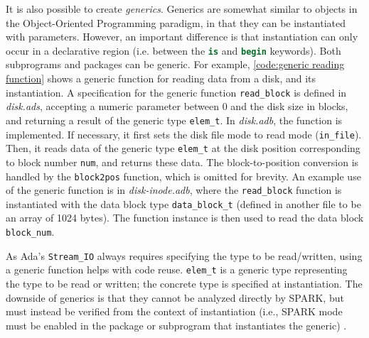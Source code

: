 It is also possible to create \textit{generics}.
Generics are somewhat similar to objects in the Object-Oriented Programming paradigm, in that they can be instantiated with parameters.
However, an important difference is that instantiation can only occur in a declarative region (i.e. between the \lstinline[language=Ada]{is} and \lstinline[language=Ada]{begin} keywords).
Both subprograms and packages can be generic.
For example, \autoref{code:generic reading function} shows a generic function for reading data from a disk, and its instantiation.
A specification for the generic function \lstinline[language=Ada]{read_block} is defined in \textit{disk.ads}, accepting a numeric parameter between 0 and the disk size in blocks, and returning a result of the generic type \lstinline[language=Ada]{elem_t}.
In \textit{disk.adb}, the function is implemented.
If necessary, it first sets the disk file mode to read mode (\lstinline[language=Ada]{in_file}).
Then, it reads data of the generic type \lstinline[language=Ada]{elem_t} at the disk position corresponding to block number \lstinline[language=Ada]{num}, and returns these data.
The block-to-position conversion is handled by the \lstinline[language=Ada]{block2pos} function, which is omitted for brevity.
An example use of the generic function is in \textit{disk-inode.adb}, where the \lstinline[language=Ada]{read_block} function is instantiated with the data block type \lstinline[language=Ada]{data_block_t} (defined in another file to be an array of 1024 bytes).
The function instance is then used to read the data block \lstinline[language=Ada]{block_num}.

As Ada's \lstinline[language=Ada]{Stream_IO} always requires specifying the type to be read/written, using a generic function helps with code reuse.
\lstinline[language=Ada]{elem_t} is a generic type representing the type to be read or written; the concrete type is specified at instantiation.
The downside of generics is that they cannot be analyzed directly by SPARK, but must instead be verified from the context of instantiation (i.e., SPARK mode must be enabled in the package or subprogram that instantiates the generic) \cite{sparkRM}.

